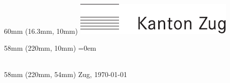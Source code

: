 

\thispagestyle{myheadings}

\iflogo%
\begin{textblock}{60mm\TPHorizModule} (16.3mm\TPHorizModule,
  10mm\TPVertModule)
  \includegraphics{logo_sw}
\end{textblock}
\fi

\iforganisation%
\begin{textblock}{58mm\TPHorizModule} (220mm\TPHorizModule,
  10mm\TPVertModule)
  \parskip=0em%
  \fontsize{8}{9}\selectfont
  \CreatorDirektion\\
  \CreatorAmt\\
  \CreatorDienststelle%
\end{textblock}
\fi

\begin{textblock}{58mm\TPHorizModule} (220mm\TPHorizModule,
  54mm\TPVertModule)
  \vspace{-\parskip}%
  \fontsize{8}{9} \selectfont
  Zug, \today\\
\end{textblock}
\vspace{22mm}
